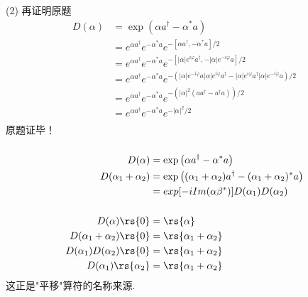     \begin{frame} 
    \frametitle{}
         
    (2) 再证明原题
    \[ 
  \begin{aligned}
      D(\alpha) &=\exp \left(\alpha a^{\dagger}-\alpha^{*} a\right) \\  
      &= e^{\alpha a^{\dagger}} e^{-\alpha^{*} a} e^{-[\alpha a^{\dagger},-\alpha^{*} a]/2}  \\
      &= e^{\alpha a^{\dagger}} e^{-\alpha^{*} a} e^{-[\left|\alpha\right| e^{i\varphi} a^{\dagger},-\left|\alpha\right| e^{-i\varphi} a]/2}  \\
      &= e^{\alpha a^{\dagger}} e^{-\alpha^{*} a} e^{-(\left|\alpha\right| e^{-i\varphi} a\left|\alpha\right| e^{i\varphi} a^{\dagger}- \left|\alpha\right| e^{i\varphi} a^{\dagger}\left|\alpha\right| e^{-i\varphi} a)/2}  \\
      &= e^{\alpha a^{\dagger}} e^{-\alpha^{*} a} e^{-(\left|\alpha\right|^2  (a a^{\dagger}-  a^{\dagger} a))/2}  \\
      &= e^{\alpha a^{\dagger}} e^{-\alpha^{*} a} e^{-\left|\alpha\right|^2 /2} \\
  \end{aligned}  
    \]
    原题证毕！
 \end{frame}

 \begin{frame}
    \frametitle{}
    \证 
  \[ 
    \begin{aligned}
        D(\alpha) &=\exp \left(\alpha a^{\dagger}-\alpha^{*} a\right) \\
        D (\alpha_1+ \alpha_2) &= \exp \left((\alpha_1+ \alpha_2) a^{\dagger}-(\alpha_1+\alpha_2)^{*} a\right) \\
        &= exp[-iIm(\alpha \beta^*)]D (\alpha_1) D(\alpha_2) \\
        & ~ \\
        D (\alpha) \rs{0} &= \rs{\alpha} \\
        D (\alpha_1+ \alpha_2) \rs{0} &= \rs{\alpha_1+ \alpha_2} \\
        D (\alpha_1) D(\alpha_2)\rs{0} &= \rs{\alpha_1+ \alpha_2} \\
        D (\alpha_1) \rs{\alpha_2} &= \rs{\alpha_1+ \alpha_2} \\
  \end{aligned}  
  \] 
  这正是"平移"算符的名称来源.
\end{frame}
 
